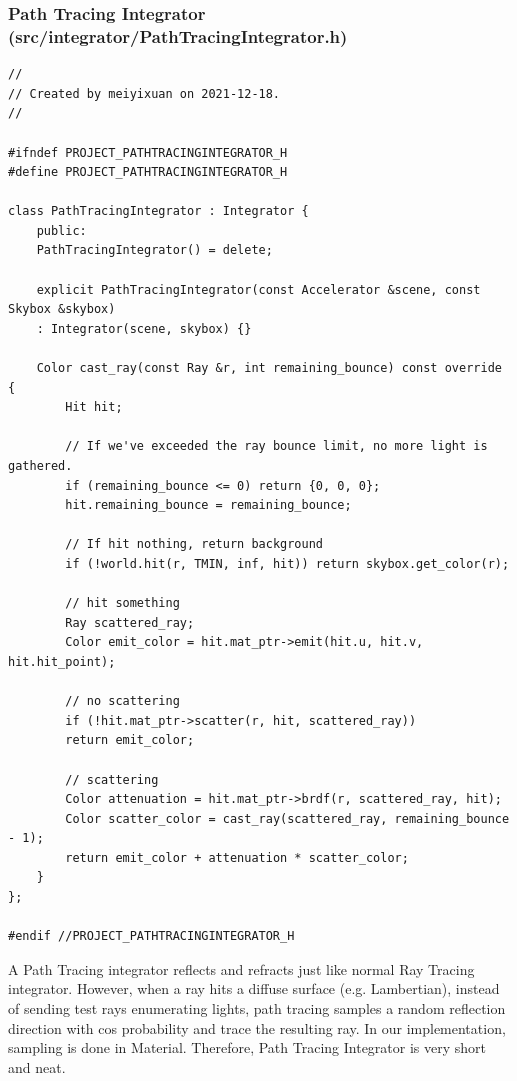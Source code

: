 \documentclass[utf8]{article}
\begin{document}
\subsubsection{Path Tracing Integrator (src/integrator/PathTracingIntegrator.h)}
\begin{lstlisting}[style=CStyle]
//
// Created by meiyixuan on 2021-12-18.
//

#ifndef PROJECT_PATHTRACINGINTEGRATOR_H
#define PROJECT_PATHTRACINGINTEGRATOR_H

class PathTracingIntegrator : Integrator {
	public:
	PathTracingIntegrator() = delete;
	
	explicit PathTracingIntegrator(const Accelerator &scene, const Skybox &skybox)
	: Integrator(scene, skybox) {}
	
	Color cast_ray(const Ray &r, int remaining_bounce) const override {
		Hit hit;
		
		// If we've exceeded the ray bounce limit, no more light is gathered.
		if (remaining_bounce <= 0) return {0, 0, 0};
		hit.remaining_bounce = remaining_bounce;
		
		// If hit nothing, return background
		if (!world.hit(r, TMIN, inf, hit)) return skybox.get_color(r);
		
		// hit something
		Ray scattered_ray;
		Color emit_color = hit.mat_ptr->emit(hit.u, hit.v, hit.hit_point);
		
		// no scattering
		if (!hit.mat_ptr->scatter(r, hit, scattered_ray))
		return emit_color;
		
		// scattering
		Color attenuation = hit.mat_ptr->brdf(r, scattered_ray, hit);
		Color scatter_color = cast_ray(scattered_ray, remaining_bounce - 1);
		return emit_color + attenuation * scatter_color;
	}
};

#endif //PROJECT_PATHTRACINGINTEGRATOR_H

\end{lstlisting}
A Path Tracing integrator reflects and refracts just like normal Ray Tracing integrator. However, when a ray hits a diffuse surface (e.g. Lambertian), instead of sending test rays enumerating lights, path tracing samples a random reflection direction with cos probability and trace the resulting ray. In our implementation, sampling is done in Material. Therefore, Path Tracing Integrator is very short and neat.
\end{document}
